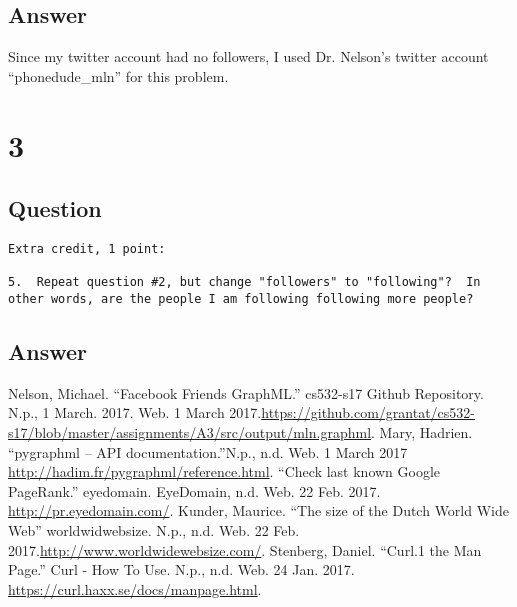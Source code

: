 \documentclass[letterpaper,11pt]{article}
\begin{document}
\subsection*{Answer}

Since my twitter account had no followers, I used Dr. Nelson's twitter account ``phonedude_mln'' for this problem. 		



\clearpage


\section*{3}

\subsection*{Question}

\begin{verbatim}
Extra credit, 1 point:

5.  Repeat question #2, but change "followers" to "following"?  In
other words, are the people I am following following more people?
\end{verbatim}

\clearpage
\subsection*{Answer}


\clearpage


\begin{thebibliography}{9}
Nelson, Michael. ``Facebook Friends GraphML.'' cs532-s17 Github Repository. N.p., 1 March. 2017. Web. 1 March 2017.\url{https://github.com/grantat/cs532-s17/blob/master/assignments/A3/src/output/mln.graphml}.
Mary, Hadrien. ``pygraphml – API documentation.''N.p., n.d. Web. 1 March 2017 \url{http://hadim.fr/pygraphml/reference.html}.
``Check last known Google PageRank.'' eyedomain. EyeDomain, n.d. Web. 22 Feb. 2017. \url{http://pr.eyedomain.com/}.
Kunder, Maurice. ``The size of the Dutch World Wide Web'' worldwidwebsize. N.p., n.d. Web. 22 Feb. 2017.\url{http://www.worldwidewebsize.com/}.
Stenberg, Daniel. ``Curl.1 the Man Page.'' Curl - How To Use. N.p., n.d. Web. 24 Jan. 2017. \url{https://curl.haxx.se/docs/manpage.html}.
\end{thebibliography}
\end{document}

